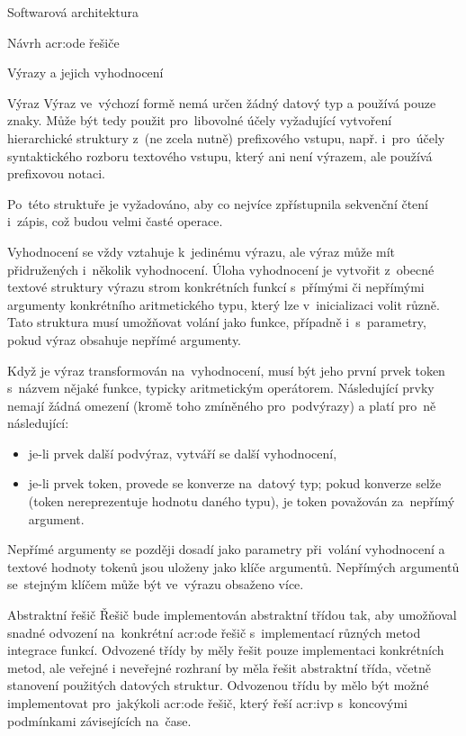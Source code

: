 \documentclass[thesis=M,czech]{FITthesis}[2012/06/26]
\newcommand{\acrlabel}[1]{acr:#1}
\newcommand{\acr}[1]{\acrshort{\acrlabel{#1}}}
\begin{document}
\begin{section}{Softwarová architektura}
\begin{subsection}{Návrh \acr{ode} řešiče}
\begin{subsubsection}{Výrazy a jejich vyhodnocení}
\begin{paragraph}{Výraz}
Výraz ve~výchozí formě nemá určen žádný datový typ
a používá pouze znaky.
Může být tedy použit pro~libovolné účely
vyžadující vytvoření hierarchické struktury
z~(ne zcela nutně) prefixového vstupu,
např. i~pro~účely syntaktického rozboru
textového vstupu, který ani není výrazem,
ale používá prefixovou notaci.

Po~této struktuře je vyžadováno,
aby co nejvíce zpřístupnila sekvenční čtení i~zápis,
což budou velmi časté operace.
\end{paragraph} %


\begin{paragraph}{Vyhodnocení}\label{p:design:arch:ode:exprs:eval}
se vždy vztahuje k~jedinému výrazu,
ale výraz může mít přidružených i~několik vyhodnocení.
Úloha vyhodnocení je vytvořit z~obecné textové struktury
výrazu strom konkrétních funkcí s~přímými či nepřímými argumenty
konkrétního aritmetického typu,
který lze v~inicializaci volit různě.
Tato struktura musí umožňovat volání jako funkce,
případně i~s~parametry,
pokud výraz obsahuje nepřímé argumenty.

Když je výraz transformován na~vyhodnocení,
musí být jeho první prvek token s~názvem nějaké funkce,
typicky aritmetickým operátorem.
Následující prvky nemají žádná omezení
(kromě toho zmíněného pro~podvýrazy)
a platí pro~ně následující:
\begin{itemize}
\item je-li prvek další podvýraz, vytváří se další vyhodnocení,
\item je-li prvek token, provede se konverze na~datový typ;
   pokud konverze selže (token nereprezentuje hodnotu daného typu),
   je token považován za~nepřímý argument.
\end{itemize}
Nepřímé argumenty se později dosadí
jako parametry při~volání vyhodnocení
a textové hodnoty tokenů jsou uloženy jako klíče argumentů.
Nepřímých argumentů se~stejným klíčem
může být ve~výrazu obsaženo více.
\end{paragraph} %


\end{subsubsection} %


\begin{subsubsection}{Abstraktní řešič}\label{sss:design:arch:ode:solver}
Řešič bude implementován abstraktní třídou tak,
aby umožňoval snadné odvození na~konkrétní \acr{ode} řešič
s~implementací různých metod integrace funkcí.
Odvozené třídy by měly řešit pouze implementaci konkrétních metod,
ale veřejné i neveřejné rozhraní by měla řešit abstraktní třída,
včetně stanovení použitých datových struktur.
Odvozenou třídu by mělo být možné
implementovat pro~jakýkoli \acr{ode} řešič,
který řeší \acr{ivp} s~koncovými podmínkami závisejících na~čase.


\end{subsubsection}
\end{subsection}
\end{section}
\end{document}
